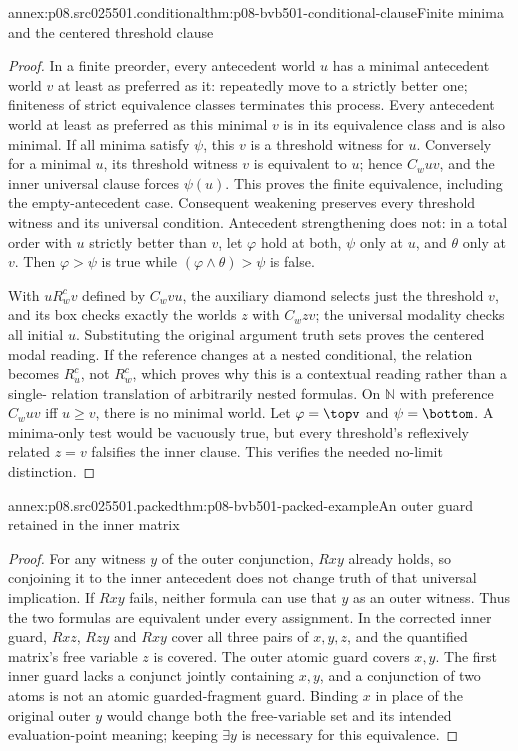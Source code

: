 \begin{annexitem}{annex:p08.src025501.conditional}{thm:p08-bvb501-conditional-clause}{Finite minima and the centered threshold clause}
\begin{proof}
In a finite preorder, every antecedent world \(u\) has a minimal
antecedent world \(v\) at least as preferred as it: repeatedly move
to a strictly better one; finiteness of strict equivalence classes
terminates this process. Every antecedent world at least as preferred
as this minimal \(v\) is in its equivalence class and is also
minimal. If all minima satisfy \(\psi\), this \(v\) is a
threshold witness for \(u\). Conversely for a minimal \(u\),
its threshold witness \(v\) is equivalent to \(u\); hence
\(C_wuv\), and the inner universal clause forces \(\psi(u)\).
This proves the finite equivalence, including the empty-antecedent case.
Consequent weakening preserves every threshold witness and its universal
condition. Antecedent strengthening does not: in a total order with
\(u\) strictly better than \(v\), let \(\varphi\) hold at
both, \(\psi\) only at \(u\), and \(\theta\) only at
\(v\). Then \(\varphi>\psi\) is true while
\((\varphi\land\theta)>\psi\) is false.

With \(uR_w^cv\) defined by \(C_wvu\), the auxiliary diamond
selects just the threshold \(v\), and its box checks exactly
the worlds \(z\) with \(C_wzv\); the universal modality checks
all initial \(u\). Substituting the original argument truth sets
proves the centered modal reading. If the reference changes at a nested
conditional, the relation becomes \(R_u^c\), not \(R_w^c\),
which proves why this is a contextual reading rather than a single-
relation translation of arbitrarily nested formulas.
On \(\mathbb N\) with preference \(C_wuv\) iff \(u\geq v\),
there is no minimal world. Let \(\varphi=\topv\) and
\(\psi=\bottom\). A minima-only test would be vacuously true,
but every threshold's reflexively related \(z=v\) falsifies the
inner clause. This verifies the needed no-limit distinction.
\end{proof}
\end{annexitem}

\begin{annexitem}{annex:p08.src025501.packed}{thm:p08-bvb501-packed-example}{An outer guard retained in the inner matrix}
\begin{proof}
For any witness \(y\) of the outer conjunction, \(Rxy\)
already holds, so conjoining it to the inner antecedent does not
change truth of that universal implication. If \(Rxy\) fails,
neither formula can use that \(y\) as an outer witness. Thus the
two formulas are equivalent under every assignment. In the corrected
inner guard, \(Rxz\), \(Rzy\) and \(Rxy\) cover all three
pairs of \(x,y,z\), and the quantified matrix's free variable
\(z\) is covered. The outer atomic guard covers \(x,y\).
The first inner guard lacks a conjunct jointly containing \(x,y\),
and a conjunction of two atoms is not an atomic guarded-fragment guard.
Binding \(x\) in place of the original outer \(y\) would
change both the free-variable set and its intended evaluation-point
meaning; keeping \(\exists y\) is necessary for this equivalence.
\end{proof}
\end{annexitem}

